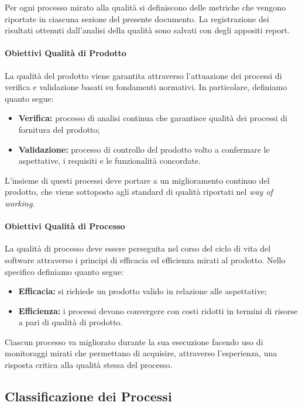 		Per ogni processo mirato alla qualità si definiscono delle metriche che vengono riportate in ciascuna sezione del presente documento.
		La registrazione dei risultati ottenuti dall'analisi della qualità sono salvati con degli appositi report.

		\paragraph{Obiettivi Qualità di Prodotto}

			La qualità del prodotto viene garantita attraverso l'attuazione dei processi di verifica e validazione basati su fondamenti normativi. In particolare, definiamo quanto segue:
			\begin{itemize}
				\item \textbf{Verifica:} processo di analisi continua che garantisce qualità dei processi di fornitura del prodotto;
				\item \textbf{Validazione:} processo di controllo del prodotto volto a confermare le aspettative, i requisiti e le funzionalità concordate.
			\end{itemize}

			L'insieme di questi processi deve portare a un miglioramento continuo del prodotto, che viene sottoposto agli standard di qualità riportati nel \textit{way of working}.

		\paragraph{Obiettivi Qualità di Processo}

			La qualità di processo deve essere perseguita nel corso del ciclo di vita del software attraverso i principi di efficacia ed efficienza mirati al prodotto.
			Nello specifico definiamo quanto segue:
			\begin{itemize}
				\item \textbf{Efficacia:} si richiede un prodotto valido in relazione alle aspettative;
				\item \textbf{Efficienza:} i processi devono convergere con costi ridotti in termini di risorse a pari di qualità di prodotto.
			\end{itemize}

			Ciascun processo va migliorato durante la sua esecuzione facendo uso di monitoraggi mirati che permettano di acquisire, attraverso l'esperienza, una risposta critica alla qualità stessa del processo.

	\subsection{Classificazione dei Processi}

